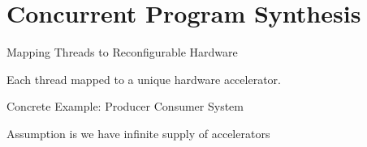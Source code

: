 \documentclass[notes, xcolor=dvipsnames]{beamer}
\begin{document}
    \section{Concurrent Program Synthesis}
    \begin{frame}{Mapping Threads to Reconfigurable Hardware}

        \begin{figure}
        \end{figure}

        Each thread mapped to a unique hardware accelerator. 

    \end{frame}

    \begin{frame}{Concrete Example: Producer Consumer System}

        \begin{figure}
        \end{figure}

        Assumption is we have infinite supply of accelerators

    \end{frame}
\end{document}
